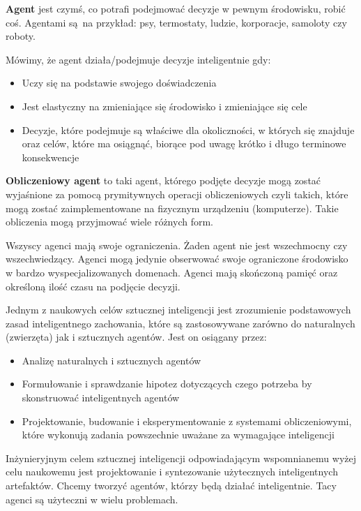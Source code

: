 \documentclass[a4paper, 12pt,oneside]{book}
\begin{document}
\textbf{Agent} jest czymś, co potrafi podejmować decyzje w pewnym środowisku,
robić coś. Agentami są na przykład: psy, termostaty, ludzie, korporacje,
samoloty czy roboty.

Mówimy, że agent działa/podejmuje decyzje inteligentnie gdy:
\begin{itemize}
	\setlength\itemsep{-0.4em}
	\item Uczy się na podstawie swojego doświadczenia
	\item Jest elastyczny na zmieniające się środowisko i zmieniające się
		cele
	\item Decyzje, które podejmuje są właściwe dla okoliczności, w których
		się znajduje oraz celów, które ma osiągnąć, biorące pod uwagę
		krótko i długo terminowe konsekwencje
\end{itemize}

\textbf{Obliczeniowy agent} to taki agent, którego podjęte decyzje mogą
zostać wyjaśnione za pomocą prymitywnych operacji obliczeniowych
czyli takich, które mogą zostać zaimplementowane na fizycznym urządzeniu
(komputerze). Takie obliczenia mogą przyjmować wiele różnych form.

Wszyscy agenci mają swoje ograniczenia. Żaden agent nie jest wszechmocny czy 
wszechwiedzący. Agenci mogą jedynie obserwować swoje ograniczone środowisko
w bardzo wyspecjalizowanych domenach. Agenci mają skończoną pamięć oraz
określoną ilość czasu na podjęcie decyzji.

Jednym z naukowych celów sztucznej inteligencji jest zrozumienie podstawowych
zasad inteligentnego zachowania, które są zastosowywane zarówno do
naturalnych (zwierzęta) jak i sztucznych
agentów\cite{ai_foundations_scientific_goal}.
Jest on osiągany przez:
\begin{itemize}
	\setlength\itemsep{-0.4em}
	\item Analizę naturalnych i sztucznych agentów
	\item Formułowanie i sprawdzanie hipotez dotyczących czego potrzeba
		by skonstruować inteligentnych agentów
	\item Projektowanie, budowanie  i eksperymentowanie z systemami
		obliczeniowymi, które wykonują zadania powszechnie uważane
		za wymagające inteligencji
\end{itemize}
Inżynieryjnym celem sztucznej inteligencji odpowiadającym wspomnianemu wyżej
celu naukowemu jest projektowanie i syntezowanie
użytecznych inteligentnych artefaktów. Chcemy tworzyć agentów, którzy będą
działać inteligentnie. Tacy agenci są użyteczni w wielu problemach.
\end{document}
